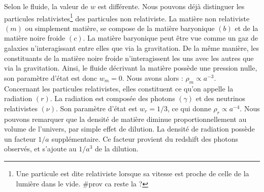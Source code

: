 \documentclass[11pt, twoside, a4paper, openright]{report}
\begin{document}
Selon le fluide, la valeur de $w$ est différente. Nous pouvons déjà distinguer les particules relativistes\footnote{Une particule est dite relativiste lorsque sa vitesse est proche de celle de la lumière dans le vide. \#prov ca reste la ?} des particules non relativiste. La matière non relativiste $(m)$ ou simplement matière, se compose de la matière baryonique $(b)$ et de la matière noire froide $(c)$.
La matière baryonique peut être vue comme un gaz de galaxies n'interagissant entre elles  que via la gravitation.
De la même manière, les constituants de la matière noire froide n'interagissent les uns avec les autres que via la gravitation.
Ainsi, le fluide décrivant la matière possède une pression nulle, son paramètre d'état est donc $w_m = 0$. Nous avons alors : $\rho_m \propto a^{-3}$. \\
Concernant les particules relativistes, elles constituent ce qu'on appelle la radiation $(r)$. La radiation est composée  des photons $(\gamma)$ et des neutrinos relativistes $(\nu)$. Son paramètre d'état est $w_r = 1/3$, ce qui donne $\rho_r \propto a^{-4}$. Nous pouvons remarquer que la densité de matière diminue proportionnellement au volume de l'univers, par simple effet de dilution. La densité de radiation possède un facteur $1/a$ supplémentaire. Ce facteur provient du redshift des photons observés, et s'ajoute au $1/a^3$ de la dilution.
\end{document}
